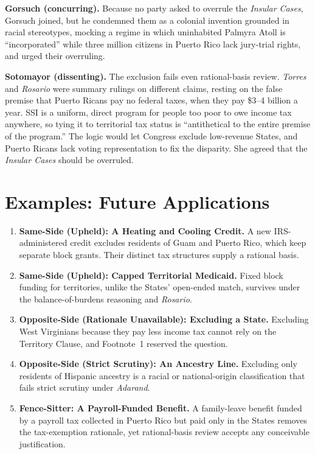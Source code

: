 \documentclass[12pt]{article}
\begin{document}
\textbf{Gorsuch (concurring).} Because no party asked to overrule the \textit{Insular Cases}, Gorsuch joined, but he condemned them as a colonial invention grounded in racial stereotypes, mocking a regime in which uninhabited Palmyra Atoll is ``incorporated'' while three million citizens in Puerto Rico lack jury-trial rights, and urged their overruling.

\textbf{Sotomayor (dissenting).} The exclusion fails even rational-basis review. \textit{Torres} and \textit{Rosario} were summary rulings on different claims, resting on the false premise that Puerto Ricans pay no federal taxes, when they pay \$3--4 billion a year. SSI is a uniform, direct program for people too poor to owe income tax anywhere, so tying it to territorial tax status is ``antithetical to the entire premise of the program.'' The logic would let Congress exclude low-revenue States, and Puerto Ricans lack voting representation to fix the disparity. She agreed that the \textit{Insular Cases} should be overruled.

\section{Examples: Future Applications}

\begin{enumerate}
\item \textbf{Same-Side (Upheld): A Heating and Cooling Credit.} A new IRS-administered credit excludes residents of Guam and Puerto Rico, which keep separate block grants. Their distinct tax structures supply a rational basis.
\item \textbf{Same-Side (Upheld): Capped Territorial Medicaid.} Fixed block funding for territories, unlike the States' open-ended match, survives under the balance-of-burdens reasoning and \textit{Rosario}.
\item \textbf{Opposite-Side (Rationale Unavailable): Excluding a State.} Excluding West Virginians because they pay less income tax cannot rely on the Territory Clause, and Footnote~1 reserved the question.
\item \textbf{Opposite-Side (Strict Scrutiny): An Ancestry Line.} Excluding only residents of Hispanic ancestry is a racial or national-origin classification that fails strict scrutiny under \textit{Adarand}.
\item \textbf{Fence-Sitter: A Payroll-Funded Benefit.} A family-leave benefit funded by a payroll tax collected in Puerto Rico but paid only in the States removes the tax-exemption rationale, yet rational-basis review accepts any conceivable justification.
\end{enumerate}
\end{document}
